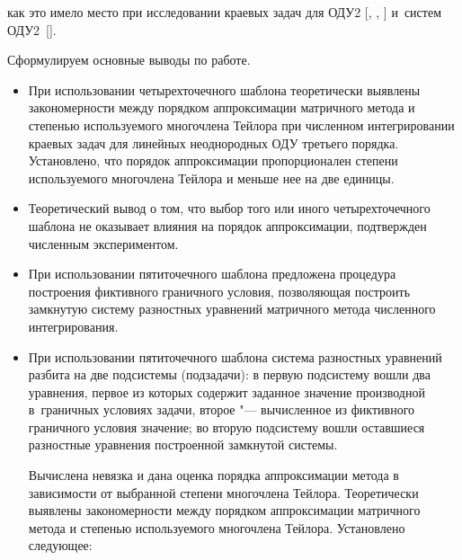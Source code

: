 как это имело место при исследовании краевых задач для ОДУ2 [, , ] и~систем ОДУ2~[].



\clearpage



 Сформулируем основные выводы по работе.



\begin{itemize}



\item[1.] При использовании четырехточечного шаблона теоретически выявлены закономерности между порядком аппроксимации матричного метода и степенью используемого многочлена Тейлора при численном интегрировании краевых задач для линейных неоднородных ОДУ третьего порядка. Установлено, что порядок аппроксимации  пропорционален степени используемого многочлена Тейлора и меньше нее на две единицы.



\item[2.] Теоретический вывод о том, что выбор того или иного четырехточечного шаблона не оказывает влияния на порядок аппроксимации, подтвержден численным экспериментом.



\item[3.] При использовании пятиточечного шаблона предложена процедура построения фиктивного граничного условия, позволяющая построить замкнутую  систему разностных уравнений матричного метода численного интегрирования.



\item[4.] При использовании пятиточечного шаблона система разностных уравнений разбита на две подсистемы (подзадачи): в первую подсистему вошли два уравнения, первое из которых содержит заданное значение производной в~граничных условиях задачи, второе "--- вычисленное из фиктивного граничного условия значение; во вторую подсистему вошли оставшиеся разностные уравнения построенной замкнутой  системы.

Вычислена невязка и дана оценка порядка аппроксимации метода в зависимости от выбранной степени многочлена Тейлора. Теоретически выявлены закономерности между порядком аппроксимации матричного метода и степенью используемого многочлена Тейлора. Установлено следующее:

\begin{itemize}




\end{itemize}
\end{itemize}
